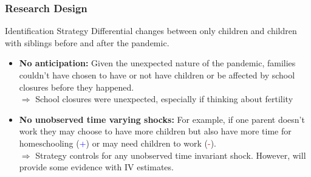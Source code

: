 \documentclass{beamer}
\begin{document}
\begin{frame}
    \label{frame:research}
    \frametitle{Research Design}
    
    \begin{block}{Identification Strategy}
    Differential changes between only children and children with siblings before and after the pandemic.
    \end{block}
    
    \begin{itemize}
         \item<2-> \textbf{No anticipation:} Given the unexpected nature of the pandemic, families couldn't have chosen to have or not have children or be affected by school closures before they happened. \\
         $\Rightarrow$ School closures were unexpected, especially if thinking about fertility
         \item<3-> \textbf{No unobserved time varying shocks:} For example, if one parent doesn't work they may choose to have more children but also have more time for homeschooling (\textcolor{blue}{+}) or may need children to work (\textcolor{red}{-}). \\
         $\Rightarrow$ Strategy controls for any unobserved time invariant shock. However, will provide some evidence with IV estimates.
    \end{itemize}
\end{frame}
\end{document}
